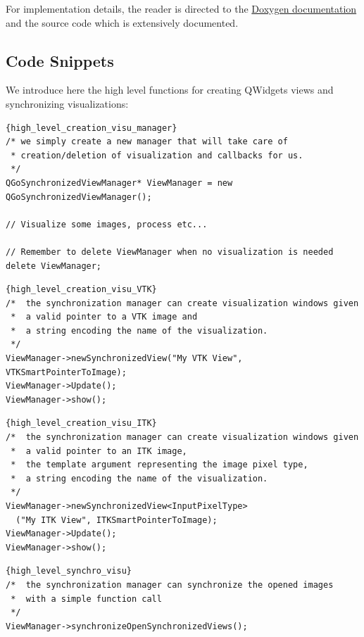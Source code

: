 \documentclass{InsightArticle}
\begin{document}
For implementation details, the reader is directed to the \href {http://gofigure2.sourceforge.net/Doxygen/Nightly/} {Doxygen documentation} and the source code which is extensively documented.

\subsection*{Code Snippets}
We introduce here the high level functions for creating QWidgets views and synchronizing visualizations:
\large
  \begin{lstlisting}[title={\large Creation of the visualization manager object}]{high_level_creation_visu_manager}
/* we simply create a new manager that will take care of 
 * creation/deletion of visualization and callbacks for us.
 */
QGoSynchronizedViewManager* ViewManager = new QGoSynchronizedViewManager();

// Visualize some images, process etc...

// Remember to delete ViewManager when no visualization is needed
delete ViewManager;
  \end{lstlisting}
\normalsize
\large
  \begin{lstlisting}[title={\large Visualization of a VTK image}]{high_level_creation_visu_VTK}
/*  the synchronization manager can create visualization windows given
 *  a valid pointer to a VTK image and 
 *  a string encoding the name of the visualization.
 */
ViewManager->newSynchronizedView("My VTK View", VTKSmartPointerToImage);
ViewManager->Update();
ViewManager->show();
  \end{lstlisting}
\normalsize
\large
  \begin{lstlisting}[title={\large Visualization of an ITK image}]{high_level_creation_visu_ITK}
/*  the synchronization manager can create visualization windows given
 *  a valid pointer to an ITK image,
 *  the template argument representing the image pixel type,
 *  a string encoding the name of the visualization.
 */
ViewManager->newSynchronizedView<InputPixelType>
  ("My ITK View", ITKSmartPointerToImage);
ViewManager->Update();
ViewManager->show();
  \end{lstlisting}
\normalsize
\large
  \begin{lstlisting}[title={\large Synchronization of the camera for several images}]{high_level_synchro_visu}
/*  the synchronization manager can synchronize the opened images 
 *  with a simple function call
 */
ViewManager->synchronizeOpenSynchronizedViews();
  \end{lstlisting}
\normalsize
\end{document}
